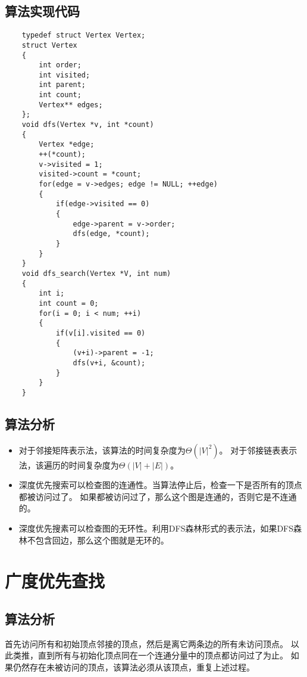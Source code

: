 \documentclass[a4paper,left=2.5cm,right=2.5cm,11pt]{article}
\begin{document}
\subsection{算法实现代码}
	\begin{lstlisting}
	typedef struct Vertex Vertex;
	struct Vertex
	{
		int order;
		int visited;
		int parent;
		int count;
		Vertex** edges;
	};
	void dfs(Vertex *v, int *count)
	{
		Vertex *edge;
		++(*count);
		v->visited = 1;
		visited->count = *count;
		for(edge = v->edges; edge != NULL; ++edge)
		{
			if(edge->visited == 0)
			{
				edge->parent = v->order;
				dfs(edge, *count);
			}
		}
	}
	void dfs_search(Vertex *V, int num)
	{
		int i;
		int count = 0;
		for(i = 0; i < num; ++i)
		{
			if(v[i].visited == 0)
			{
				(v+i)->parent = -1;
				dfs(v+i, &count);
			}
		}
	}
	\end{lstlisting}
\subsection{算法分析}
	\begin{itemize}
		\item 对于邻接矩阵表示法，该算法的时间复杂度为$\Theta(|V|^2)$。
		对于邻接链表表示法，该遍历的时间复杂度为$\Theta(|V|+|E|)$。
		\item 深度优先搜索可以检查图的连通性。当算法停止后，检查一下是否所有的顶点都被访问过了。
		如果都被访问过了，那么这个图是连通的，否则它是不连通的。
		\item 深度优先搜素可以检查图的无环性。利用DFS森林形式的表示法，如果DFS森林不包含回边，那么这个图就是无环的。
	\end{itemize}

\section{广度优先查找}
\subsection{算法分析}
	首先访问所有和初始顶点邻接的顶点，然后是离它两条边的所有未访问顶点。
	以此类推，直到所有与初始化顶点同在一个连通分量中的顶点都访问过了为止。
	如果仍然存在未被访问的顶点，该算法必须从该顶点，重复上述过程。
\end{document}
